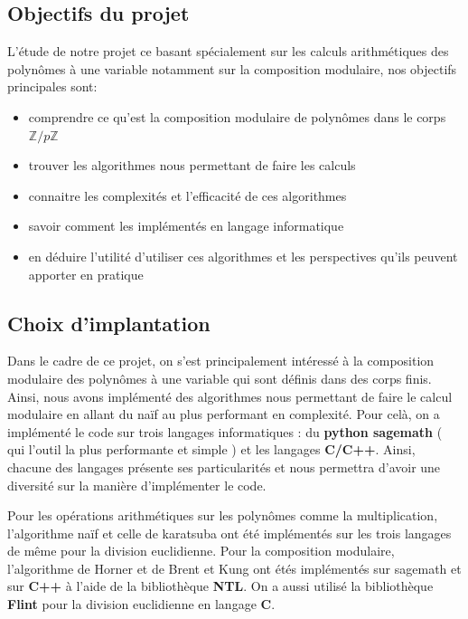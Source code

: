 \documentclass[a4paper]{article}
\begin{document}
\subsection{Objectifs du projet}

L'étude de notre projet ce basant spécialement sur les calculs arithmétiques des polynômes à une variable notamment sur la composition modulaire, nos objectifs principales sont:
\begin{itemize}
	\item comprendre ce qu'est la composition modulaire de polynômes dans le corps ${\mathbb{Z}/p \mathbb{Z}}$
	\item trouver les algorithmes nous permettant de faire les calculs 
	\item connaitre les complexités et l'efficacité de ces algorithmes
	\item savoir comment les implémentés en langage informatique 
	\item en déduire l'utilité d'utiliser ces algorithmes et les perspectives qu'ils peuvent apporter en pratique

\end{itemize}

\subsection{Choix d'implantation}

Dans le cadre de ce projet, on s'est principalement intéressé à la composition modulaire des polynômes à une variable qui sont définis dans des corps finis. Ainsi, nous avons implémenté des algorithmes nous permettant de faire le calcul modulaire en allant du naïf au plus performant en complexité. Pour celà, on a implémenté le code sur trois langages informatiques : du \textbf{python sagemath} ( qui l'outil la plus performante et simple ) et les langages \textbf{C/C++}. Ainsi, chacune des langages présente ses particularités et nous permettra d'avoir une diversité sur la manière d'implémenter le code.

Pour les opérations arithmétiques sur les polynômes comme la multiplication, l'algorithme naïf et celle de karatsuba ont été implémentés sur les trois langages de même pour la division euclidienne. Pour la composition modulaire, l'algorithme de Horner et de Brent et Kung ont étés implémentés sur sagemath et sur \textbf{C++} à l'aide de la bibliothèque \textbf{NTL}. On a aussi utilisé la bibliothèque \textbf{Flint} pour la division euclidienne en langage \textbf{C}.
\end{document}
